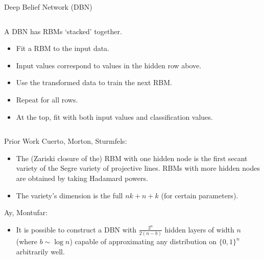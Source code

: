 \documentclass[mathserif,xcolor=dvipsnames]{beamer}
\begin{document}
\begin{frame}{Deep Belief Network (DBN)}
    \begin{columns}[T]
    \begin{column}{0.6\textwidth}
    A DBN has RBMs `stacked' together.

    \begin{itemize}
    \item Fit a RBM to the input data.
    \item Input values correspond to values in the hidden row above.
    \item Use the transformed data to train the next RBM.
    \item Repeat for all rows.
    \item At the top, fit with both input values and classification values.
    \end{itemize}

    \end{column}

    \begin{column}{0.3\textwidth}
    \begin{center}
    \end{center}
    \end{column}
    \end{columns}
\end{frame}

\begin{frame}{Prior Work}
    Cuerto, Morton, Sturmfels:\\
    \begin{itemize}
    \item[] The (Zariski closure of the) RBM with one hidden node is the first
    secant variety of the Segre variety of projective lines.  RBMs with more
    hidden nodes are obtained by taking Hadamard powers.

    \item[] The variety's dimension is the full $nk + n + k$ (for certain parameters).
    \end{itemize}

    Ay, Montufar:\\
    \begin{itemize}
    \item[] It is possible to construct a DBN with $\frac{2^n}{2(n-b)}$ hidden
    layers of width $n$ (where $b \sim \log n$) capable of approximating any
    distribution on $\{0,1\}^n$ arbitrarily well.
    \end{itemize}

\end{frame}
\end{document}
